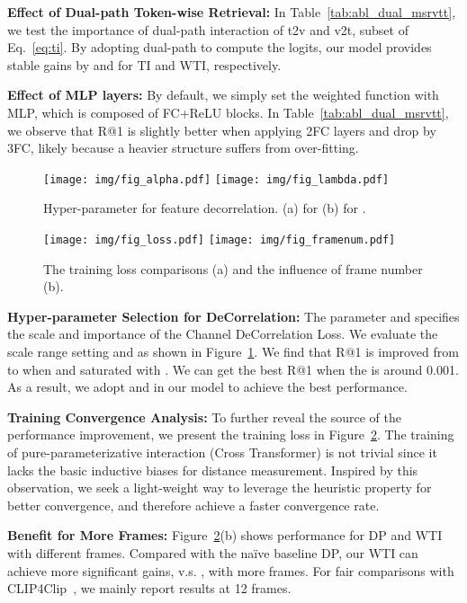 \documentclass[runningheads]{llncs}
\begin{document}
\noindent\textbf{Effect of Dual-path Token-wise Retrieval:} 
In Table~\ref{tab:abl_dual_msrvtt}, we test the importance of dual-path interaction of t2v and v2t, subset of Eq.~\ref{eq:ti}. 
By adopting dual-path to compute the logits, our model provides stable gains by  and  for TI and WTI, respectively.

\noindent\textbf{Effect of MLP layers:}  By default, we simply set the weighted function with MLP, which is composed of FC+ReLU blocks.
In Table~\ref{tab:abl_dual_msrvtt}, we observe that R@1 is slightly better when applying 2FC layers and drop by 3FC, likely because a heavier structure suffers from over-fitting.

\begin{figure}[t]
\centering
\texttt{[image: img/fig\_alpha.pdf]}
\texttt{[image: img/fig\_lambda.pdf]}
\vspace{-4mm}
\caption{Hyper-parameter for feature decorrelation. (a)  for  (b)  for .}
\vspace{-5mm}
\label{fig:hp}
\end{figure}
\begin{figure}[t]
\centering
\texttt{[image: img/fig\_loss.pdf]}
\texttt{[image: img/fig\_framenum.pdf]}
\vspace{-4mm}
\caption{The training loss comparisons (a) and the influence of frame number (b).}
\label{fig:loss}
\end{figure}

\noindent\textbf{Hyper-parameter Selection for DeCorrelation:}  The parameter  and   specifies the scale and importance of the Channel DeCorrelation Loss.
We evaluate the scale range setting  and  as shown in Figure~\ref{fig:hp}. 
We find that R@1 is improved from  to  when  and saturated with .
We can get the best R@1 when the  is around 0.001.
As a result, we adopt   and  in our model to achieve the best performance.

\noindent\textbf{Training Convergence Analysis:}  
To further reveal the source of the performance improvement, we present the training loss in Figure~\ref{fig:loss}. 
The training of pure-parameterizative interaction (Cross Transformer) is not trivial since it lacks the basic inductive biases for distance measurement. 
Inspired by this observation, we seek a light-weight way to leverage the heuristic property for better convergence, and therefore achieve a faster convergence rate.


\noindent\textbf{Benefit for More Frames:} 
Figure~\ref{fig:loss}(b) shows performance for DP and WTI with different frames. 
Compared with the naïve baseline DP, our WTI can achieve more significant gains,  v.s. , with more frames. For fair comparisons with CLIP4Clip~\cite{clip4clip}, we mainly report results at 12 frames.
\end{document}
